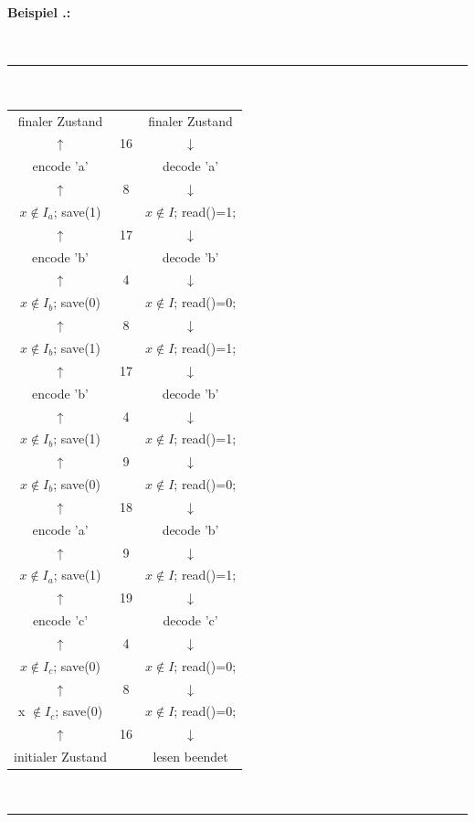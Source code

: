 \documentclass[a4paper,12pt]{article}
\newcounter{Beispiel}
\newenvironment{Beispiel}{
\medskip
        
        \setlength{\parindent}{0pt}
        \addtocounter{Beispiel}{1}
        \textbf{\textsf{Beispiel \thesubsection.\theBeispiel}:}\\}{
        \nopagebreak
        \vspace{-1.0ex}
        \bigskip
        
}
\begin{document}
\begin{Beispiel}
\begin{center}
\vspace{-0.2cm}
\\
{\color{gray!50!blue}\rule{8cm}{0.1mm}}
\\
\begin{tabular}{c c c}
finaler Zustand & & finaler Zustand
\\
$\uparrow$ & 16 & $\downarrow$
\\
encode 'a' & & decode 'a'
\\
$\uparrow$ & 8 & $\downarrow$
\\
$x \not\in I_{a}$; save(1) &  & $x\not\in I$; read()=1;
\\
$\uparrow$ & 17 & $\downarrow$
\\
encode 'b' & & decode 'b'
\\
$\uparrow$ & 4 & $\downarrow$ 
\\
$x \not\in I_{b}$; save(0) &  & $x\not\in I$; read()=0;
\\
$\uparrow$ & 8 & $\downarrow$
\\
$x \not\in I_{b}$; save(1) &  &$x\not\in I$; read()=1;
\\
$\uparrow$ & 17 & $\downarrow$
\\
encode 'b' & & decode 'b'
\\
$\uparrow$ & 4 & $\downarrow$
\\
$x \not\in I_{b}$; save(1) &  &$x\not\in I$; read()=1;
\\
$\uparrow$ & 9 & $\downarrow$
\\
$x \not\in I_{b}$; save(0) &  &$x\not\in I$; read()=0;
\\
$\uparrow$ & 18 & $\downarrow$
\\
encode 'a' & & decode 'b'
\\
$\uparrow$ & 9 & $\downarrow$
\\
$x \not\in I_{a}$; save(1) &  & $x\not\in I$; read()=1;
\\
$\uparrow$ & 19 & $\downarrow$
\\
encode 'c' & & decode 'c'
\\
$\uparrow$ & 4 & $\downarrow$
\\
$x \not\in I_{c}$; save(0) &  & $x\not\in I$; read()=0;
\\
$\uparrow$ & 8 & $\downarrow$
\\
x $\not\in I_{c}$; save(0) &  & $x\not\in I$; read()=0;
\\
$\uparrow$ & 16  & $\downarrow$
\\
initialer Zustand & & lesen beendet
\end{tabular}
\\
{\color{gray!50!red}\rule{8cm}{0.1mm}}
\end{center}
\end{Beispiel}
\end{document}
